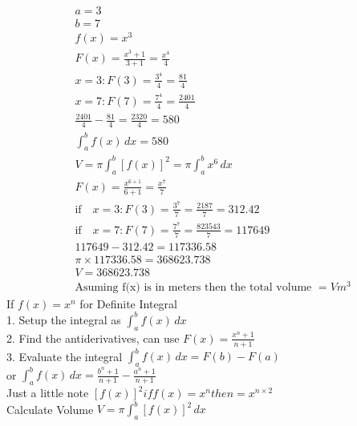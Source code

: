 \documentclass{article}
\begin{document}
\begin{align*}
    &a = 3 \\
    &b = 7 \\
    &f(x) = x^3 \\
    &F(x) = \frac{x^3+1}{3+1} = \frac{x^4}{4}\\
    &x = 3: F(3) = \frac{3^4}{4} = \frac{81}{4} \\
    &x = 7 : F(7) = \frac{7^4}{4} = \frac{2401}{4}\\
    &\frac{2401}{4} - \frac{81}{4} = \frac{2320}{4} = 580 \\
    &\int_{a}^{b} f(x) \,dx = 580 \\
    &V = \pi \int_{a}^{b} \left[f(x)\right]^2 = \pi \int_{a}^{b} x^6 \,dx \\
    &F(x) = \frac{x^{6+1}}{6+1} = \frac{x^7}{7} \\
    &\text{if} \quad x=3:F(3) = \frac{3^7}{7} = \frac{2187}{7} = 312.42 \\
    &\text{if} \quad x=7:F(7) = \frac{7^7}{7} = \frac{823543}{7} = 117649 \\
    &117649 - 312.42 = 117336.58 \\
    &\pi \times 117336.58 = 368623.738 \\
    &V = 368623.738 \\
    &\text{Asuming f(x) is in meters then the total volume } = Vm^3
\end{align*}
\newpage
If \! $f(x) = x^n$ for Definite Integral\\
1. Setup the integral as \! $\int_{a}^{b} f(x) \,dx$ \\
2. Find the antiderivatives, can use \! $F(x) = \frac{x^n + 1}{n + 1}$ \\
3. Evaluate the integral \! $\int_{a}^{b} f(x) \,dx = F(b) - F(a)$ \\
or \! $\int_{a}^{b} f(x) \,dx = \frac{b^n+1}{n+1} - \frac{a^n+1}{n+1}$ \\
Just a little note \! $\left[f(x)\right]^2 if f(x)=x^n then = x^{n\times2}$ \\
Calculate Volume \! $V = \pi \int_{a}^{b} \left[f(x)\right]^2 \,dx$
\end{document}

